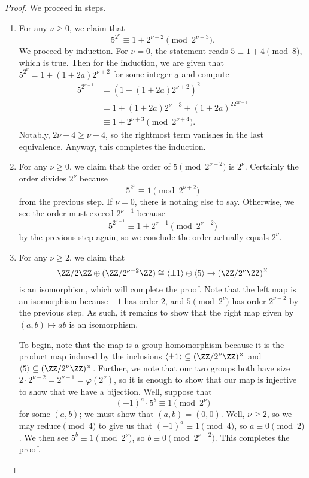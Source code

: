 \documentclass[../notes.tex]{subfiles}
\begin{document}
\begin{proof}
	We proceed in steps.
	\begin{enumerate}
		\item For any $\nu\ge0$, we claim that
		\[5^{2^\nu}\equiv1+2^{\nu+2}\pmod{2^{\nu+3}}.\]
		We proceed by induction. For $\nu=0$, the statement reads $5\equiv1+4\pmod8$, which is true. Then for the induction, we are given that $5^{2^\nu}=1+(1+2a)2^{\nu+2}$ for some integer $a$ and compute
		\begin{align*}
			5^{2^{\nu+1}} &= \left(1+(1+2a)2^{\nu+2}\right)^2 \\
			&= 1+(1+2a)2^{\nu+3}+(1+2a)^22^{2\nu+4} \\
			&\equiv 1+2^{\nu+3}\pmod{2^{\nu+4}}.
		\end{align*}
		Notably, $2\nu+4\ge\nu+4$, so the rightmost term vanishes in the last equivalence. Anyway, this completes the induction.

		\item For any $\nu\ge0$, we claim that the order of $5\pmod{2^{\nu+2}}$ is $2^{\nu}$. Certainly the order divides $2^\nu$ because
		\[5^{2^\nu}\equiv1\pmod{2^{\nu+2}}\]
		from the previous step. If $\nu=0$, there is nothing else to say. Otherwise, we see the order must exceed $2^{\nu-1}$ because
		\[5^{2^{\nu-1}}\equiv1+2^{\nu+1}\pmod{2^{\nu+2}}\]
		by the previous step again, so we conclude the order actually equals $2^\nu$.

		\item For any $\nu\ge2$, we claim that
		\[\ZZ/2\ZZ\oplus(\ZZ/2^{\nu-2}\ZZ)\cong\langle\pm1\rangle\oplus\langle5\rangle\to\left(\ZZ/2^\nu\ZZ\right)^\times\]
		is an isomorphism, which will complete the proof. Note that the left map is an isomorphism because $-1$ has order $2$, and $5\pmod{2^{\nu}}$ has order $2^{\nu-2}$ by the previous step. As such, it remains to show that the right map given by $(a,b)\mapsto ab$ is an isomorphism.

		To begin, note that the map is a group homomorphism because it is the product map induced by the inclusions $\langle\pm1\rangle\subseteq(\ZZ/2^\nu\ZZ)^\times$ and $\langle5\rangle\subseteq(\ZZ/2^\nu\ZZ)^\times$. Further, we note that our two groups both have size $2\cdot2^{\nu-2}=2^{\nu-1}=\varphi\left(2^\nu\right)$, so it is enough to show that our map is injective to show that we have a bijection. Well, suppose that
		\[(-1)^a\cdot5^b\equiv1\pmod{2^\nu}\]
		for some $(a,b)$; we must show that $(a,b)=(0,0)$. Well, $\nu\ge2$, so we may reduce$\pmod4$ to give us that $(-1)^a\equiv1\pmod4$, so $a\equiv0\pmod2$. We then see $5^b\equiv1\pmod{2^\nu}$, so $b\equiv0\pmod{2^{\nu-2}}$. This completes the proof.
		\qedhere
	\end{enumerate}
\end{proof}
\end{document}
